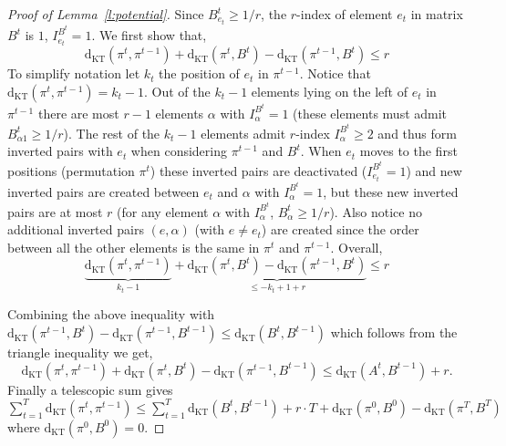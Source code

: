 \begin{proof}[Proof of Lemma~\ref{l:potential}]
Since $B_{e_t}^t \geq 1/r$, the $r$-index of element $e_t$ in matrix $B^t$ is $1$, $I_{e_t}^{B^{t}} = 1$. We first show that, $$\mathrm{d}_{\mathrm{KT}}\left(\pi^t, \pi^{t-1}\right)
+ \mathrm{d}_{\mathrm{KT}}\left(\pi^t, B^{t}\right)
- \mathrm{d}_{\mathrm{KT}}\left(\pi^{t-1}, B^{t}\right) \leq r$$ 
To simplify notation let $k_t$ the position of $e_t$ in $\pi^{t-1}$. Notice that $\mathrm{d}_{\mathrm{KT}}\left(\pi^t, \pi^{t-1}\right) = k_t -1$. Out of the $k_t - 1$ elements lying on the left of $e_t$ in $\pi^{t-1}$ there are most $r-1$ elements $\alpha$ with $I_{\alpha}^{B^t} = 1$ (these elements must admit $B_{\alpha 1}^t \geq 1/r$). The rest of the $k_t - 1$ elements admit $r$-index $I_{\alpha}^{B^t} \geq 2$ and thus form inverted pairs with $e_t$ when considering $\pi^{t-1}$ and $B^t$. When $e_t$ moves to the first positions (permutation $\pi^t$) these inverted pairs are deactivated ($I_{e_t}^{B^t} = 1$) and new inverted pairs are created between $e_t$ and $\alpha$ with $I_{\alpha}^{B^t} = 1$, but these new inverted pairs are at most $r$ (for any element $\alpha$ with $I_{\alpha}^{B^t}$, $B^t_{\alpha} \geq 1/r$). Also notice no additional inverted pairs $(e,\alpha)$ (with $e \neq e_t$) are created since the order between all the other elements is the same in $\pi^t$ and $\pi^{t-1}$. Overall,
$$\underbrace{\mathrm{d}_{\mathrm{KT}}\left(\pi^t, \pi^{t-1}\right)}_{ k_t - 1}
+ \underbrace{\mathrm{d}_{\mathrm{KT}}\left(\pi^t, B^{t}\right)
- \mathrm{d}_{\mathrm{KT}}\left(\pi^{t-1}, B^{t}\right)}_{\leq -k_t + 1 + r} \leq r$$

\noindent Combining the above inequality with $\mathrm{d}_{\mathrm{KT}}\left(\pi^{t-1}, B^{t}\right)
- \mathrm{d}_{\mathrm{KT}}\left(\pi^{t-1}, B^{t-1}\right) \leq \mathrm{d}_{\mathrm{KT}}\left(B^t, B^{t-1}\right)$ which follows from the triangle inequality we get,
$$\mathrm{d}_{\mathrm{KT}}\left(\pi^t, \pi^{t-1}\right)
+ \mathrm{d}_{\mathrm{KT}}\left(\pi^t, B^{t}\right)
- \mathrm{d}_{\mathrm{KT}}\left(\pi^{t-1}, B^{t-1}\right) \leq \mathrm{d}_{\mathrm{KT}}\left(A^{t}, B^{t-1}\right) +  r.$$
Finally a telescopic sum gives $\sum_{t=1}^T \mathrm{d}_{\mathrm{KT}}\left(\pi^t, \pi^{t-1}\right) \leq \sum_{t=1}^T \mathrm{d}_{\mathrm{KT}}\left(B^t, B^{t-1}\right)
+ r\cdot T + \mathrm{d}_{\mathrm{KT}}(\pi^0,B^0) - \mathrm{d}_{\mathrm{KT}}(\pi^T,B^T)
$ where $\mathrm{d}_{\mathrm{KT}}(\pi^0,B^0) = 0$.
\end{proof}